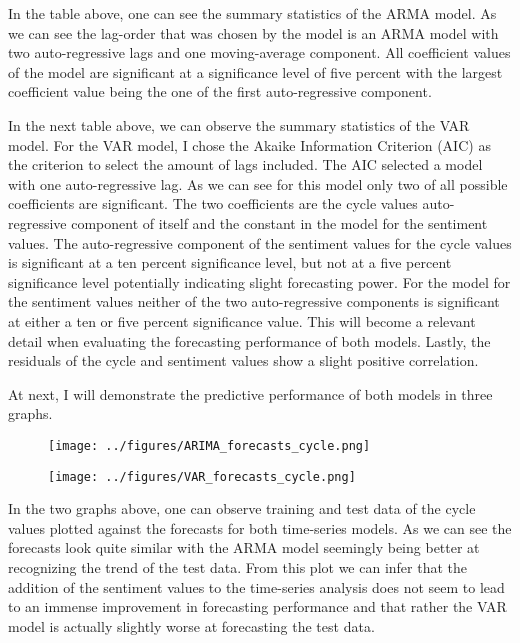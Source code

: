 \documentclass[11pt, a4paper, leqno]{article}
\begin{document}
In the table above, one can see the summary statistics of the ARMA model. As we can see the lag-order that was chosen by the model is an ARMA model with two auto-regressive lags and one moving-average component. All coefficient values of the model are significant at a significance level of five percent with the largest coefficient value being the one of the first auto-regressive component.


In the next table above, we can observe the summary statistics of the VAR model. For the VAR model, I chose the Akaike Information Criterion (AIC) as the criterion to select the amount of lags included. The AIC selected a model with one auto-regressive lag. As we can see for this model only two of all possible coefficients are significant. The two coefficients are the cycle values auto-regressive component of itself and the constant in the model for the sentiment values. The auto-regressive component of the sentiment values for the cycle values is significant at a ten percent significance level, but not at a five percent significance level potentially indicating slight forecasting power. For the model for the sentiment values neither of the two auto-regressive components is significant at either a ten or five percent significance value. This will become a relevant detail when evaluating the forecasting performance of both models.
Lastly, the residuals of the cycle and sentiment values show a slight positive correlation.

At next, I will demonstrate the predictive performance of both models in three graphs.

\begin{figure}[ht!]
    \texttt{[image: ../figures/ARIMA\_forecasts\_cycle.png]}
\end{figure}
\newpage
\begin{figure}[ht!]
    \texttt{[image: ../figures/VAR\_forecasts\_cycle.png]}
\end{figure}

In the two graphs above, one can observe training and test data of the cycle values plotted against the forecasts for both time-series models. As we can see the forecasts look quite similar with the ARMA model seemingly being better at recognizing the trend of the test data. From this plot we can infer that the addition of the sentiment values to the time-series analysis does not seem to lead to an immense improvement in forecasting performance and that rather the VAR model is actually slightly worse at forecasting the test data.
\end{document}
